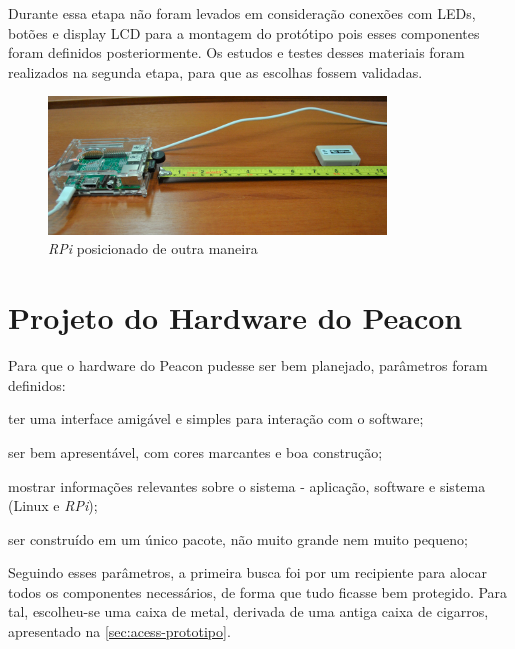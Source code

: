 Durante essa etapa não foram levados em consideração conexões com LEDs, botões e display LCD para a montagem do protótipo pois esses componentes foram definidos posteriormente. Os estudos e testes desses materiais foram realizados na segunda etapa, para que as escolhas fossem validadas.

\begin{figure}[htb]
	\caption{\label{fig:posiciona-rpi}\textit{RPi} posicionado de outra maneira}
	\begin{center}
		\includegraphics[width=0.8\textwidth]{img/ambiente2.jpg}
	\end{center}
\end{figure}

\section{Projeto do Hardware do Peacon}\label{sec:segunda-etapa}

Para que o hardware do Peacon pudesse ser bem planejado, parâmetros foram definidos:

\begin{alineas}
	\item ter uma interface amigável e simples para interação com o software;
	\item ser bem apresentável, com cores marcantes e boa construção;
	\item mostrar informações relevantes sobre o sistema - aplicação, software e sistema (Linux e \textit{RPi});
	\item ser construído em um único pacote, não muito grande nem muito pequeno;
\end{alineas}

Seguindo esses parâmetros, a primeira busca foi por um recipiente para alocar todos os componentes necessários, de forma que tudo ficasse bem protegido. Para tal, escolheu-se uma caixa de metal, derivada de uma antiga caixa de cigarros, apresentado na \autoref{sec:acess-prototipo}.

